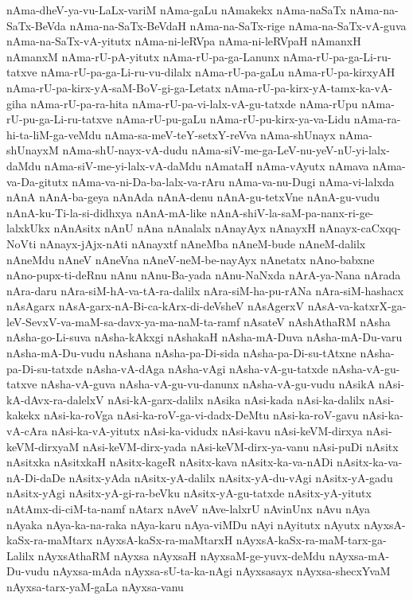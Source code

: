 {nAma-dheV-ya-vu-LaLx-variM
nAma-gaLu
nAmakekx
nAma-naSaTx
nAma-na-SaTx-BeVda
nAma-na-SaTx-BeVdaH
nAma-na-SaTx-rige
nAma-na-SaTx-vA-guva
nAma-na-SaTx-vA-yitutx
nAma-ni-leRVpa
nAma-ni-leRVpaH
nAmanxH
nAmanxM
nAma-rU-pA-yitutx
nAma-rU-pa-ga-Lanunx
nAma-rU-pa-ga-Li-ru-tatxve
nAma-rU-pa-ga-Li-ru-vu-dilalx
nAma-rU-pa-gaLu
nAma-rU-pa-kirxyAH
nAma-rU-pa-kirx-yA-saM-BoV-gi-ga-Letatx
nAma-rU-pa-kirx-yA-tamx-ka-vA-giha
nAma-rU-pa-ra-hita
nAma-rU-pa-vi-lalx-vA-gu-tatxde
nAma-rUpu
nAma-rU-pu-ga-Li-ru-tatxve
nAma-rU-pu-gaLu
nAma-rU-pu-kirx-ya-va-Lidu
nAma-ra-hi-ta-liM-ga-veMdu
nAma-sa-meV-teY-setxY-reVva
nAma-shUnayx
nAma-shUnayxM
nAma-shU-nayx-vA-dudu
nAma-siV-me-ga-LeV-nu-yeV-nU-yi-lalx-daMdu
nAma-siV-me-yi-lalx-vA-daMdu
nAmataH
nAma-vAyutx
nAmava
nAma-va-Da-gitutx
nAma-va-ni-Da-ba-lalx-va-rAru
nAma-va-nu-Dugi
nAma-vi-lalxda
nAnA
nAnA-ba-geya
nAnAda
nAnA-denu
nAnA-gu-tetxVne
nAnA-gu-vudu
nAnA-ku-Ti-la-si-didhxya
nAnA-mA-like
nAnA-shiV-la-saM-pa-nanx-ri-ge-lalxkUkx
nAnAsitx
nAnU
nAna
nAnalalx
nAnayAyx
nAnayxH
nAnayx-caCxqq-NoVti
nAnayx-jAjx-nAti
nAnayxtf
nAneMba
nAneM-bude
nAneM-dalilx
nAneMdu
nAneV
nAneVna
nAneV-neM-be-nayAyx
nAnetatx
nAno-babxne
nAno-pupx-ti-deRnu
nAnu
nAnu-Ba-yada
nAnu-NaNxda
nArA-ya-Nana
nArada
nAra-daru
nAra-siM-hA-va-tA-ra-dalilx
nAra-siM-ha-pu-rANa
nAra-siM-hashacx
nAsAgarx
nAsA-garx-nA-Bi-ca-kArx-di-deVsheV
nAsAgerxV
nAsA-va-katxrX-ga-leV-SevxV-va-maM-sa-davx-ya-ma-naM-ta-ramf
nAsateV
nAshAthaRM
nAsha
nAsha-go-Li-suva
nAsha-kAkxgi
nAshakaH
nAsha-mA-Duva
nAsha-mA-Du-varu
nAsha-mA-Du-vudu
nAshana
nAsha-pa-Di-sida
nAsha-pa-Di-su-tAtxne
nAsha-pa-Di-su-tatxde
nAsha-vA-dAga
nAsha-vAgi
nAsha-vA-gu-tatxde
nAsha-vA-gu-tatxve
nAsha-vA-guva
nAsha-vA-gu-vu-danunx
nAsha-vA-gu-vudu
nAsikA
nAsi-kA-dAvx-ra-dalelxV
nAsi-kA-garx-dalilx
nAsika
nAsi-kada
nAsi-ka-dalilx
nAsi-kakekx
nAsi-ka-roVga
nAsi-ka-roV-ga-vi-dadx-DeMtu
nAsi-ka-roV-gavu
nAsi-ka-vA-cAra
nAsi-ka-vA-yitutx
nAsi-ka-vidudx
nAsi-kavu
nAsi-keVM-dirxya
nAsi-keVM-dirxyaM
nAsi-keVM-dirx-yada
nAsi-keVM-dirx-ya-vanu
nAsi-puDi
nAsitx
nAsitxka
nAsitxkaH
nAsitx-kageR
nAsitx-kava
nAsitx-ka-va-nADi
nAsitx-ka-va-nA-Di-daDe
nAsitx-yAda
nAsitx-yA-dalilx
nAsitx-yA-du-vAgi
nAsitx-yA-gadu
nAsitx-yAgi
nAsitx-yA-gi-ra-beVku
nAsitx-yA-gu-tatxde
nAsitx-yA-yitutx
nAtAmx-di-ciM-ta-namf
nAtarx
nAveV
nAve-lalxrU
nAvinUnx
nAvu
nAya
nAyaka
nAya-ka-na-raka
nAya-karu
nAya-viMDu
nAyi
nAyitutx
nAyutx
nAyxsA-kaSx-ra-maMtarx
nAyxsA-kaSx-ra-maMtarxH
nAyxsA-kaSx-ra-maM-tarx-ga-Lalilx
nAyxsAthaRM
nAyxsa
nAyxsaH
nAyxsaM-ge-yuvx-deMdu
nAyxsa-mA-Du-vudu
nAyxsa-mAda
nAyxsa-sU-ta-ka-nAgi
nAyxsasayx
nAyxsa-shecxYvaM
nAyxsa-tarx-yaM-gaLa
nAyxsa-vanu
}
